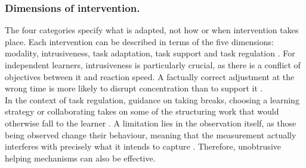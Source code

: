\documentclass[runningheads]{llncs}
\begin{document}
\subsubsection{Dimensions of intervention.}
The four categories specify what is adapted, not how or when intervention takes place. Each intervention can be described in terms of the five dimensions: modality, intrusiveness, task adaptation, task support and task regulation \cite{youssef_when_2025}.
For independent learners, intrusiveness is particularly crucial, as there is a conflict of objectives between it and reaction speed. A factually correct adjustment at the wrong time is more likely to disrupt concentration than to support it \cite{youssef_when_2025}. \\
In the context of task regulation, guidance on taking breaks, choosing a learning strategy or collaborating takes on some of the structuring work that would otherwise fall to the learner \cite{youssef_when_2025}. A limitation lies in the observation itself, as those being observed change their behaviour, meaning that the measurement actually interferes with precisely what it intends to capture \cite{hong_advances_2025}. Therefore, unobtrusive helping mechanisms can also be effective.


\end{document}

